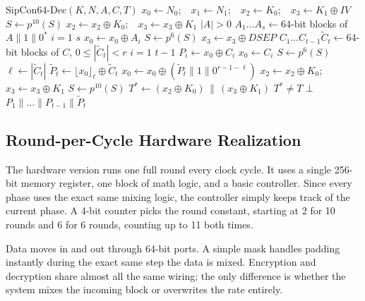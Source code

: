 \begin{algo}{$\mathrm{SipCon64\text{-}Dec}(K, N, A, C, T)$}\label{alg:dec}
\aln $x_0 \leftarrow N_0$;\ \ $x_1 \leftarrow N_1$;\ \ $x_2 \leftarrow K_0$;\ \ $x_3 \leftarrow K_1 \oplus \mathit{IV}$
\aln $S \leftarrow p^{10}(S)$
\aln $x_2 \leftarrow x_2 \oplus K_0$;\ \ $x_3 \leftarrow x_3 \oplus K_1$
\aln {} $|A| > 0$ 
\aln[1] $A_1 \dots A_s \leftarrow 64$-bit blocks of $A\|1\|0^{*}$
\aln[1]  $i = 1$  $s$ 
\aln[2] $x_0 \leftarrow x_0 \oplus A_i$
\aln[2] $S \leftarrow p^{6}(S)$
\aln[1] 
\aln {}
\aln $x_3 \leftarrow x_3 \oplus \mathit{DSEP}$ 
\aln $C_1 \dots C_{t-1}\tilde{C}_t \leftarrow 64$-bit blocks of $C$, $0 \le |\tilde{C}_t| < r$
\aln {} $i = 1$  $t-1$ 
\aln[1] $P_i \leftarrow x_0 \oplus C_i$
\aln[1] $x_0 \leftarrow C_i$ 
\aln[1] $S \leftarrow p^{6}(S)$
\aln {}
\aln $\ell \leftarrow |\tilde{C}_t|$
\aln $\tilde{P}_t \leftarrow \lfloor x_0 \rfloor_{\ell} \oplus \tilde{C}_t$
\aln $x_0 \leftarrow x_0 \oplus (\tilde{P}_t\|1\|0^{r-1-\ell})$ 
\aln $x_2 \leftarrow x_2 \oplus K_0$;\ \ $x_3 \leftarrow x_3 \oplus K_1$
\aln $S \leftarrow p^{10}(S)$
\aln $T^{*} \leftarrow (x_2 \oplus K_0) \,\|\, (x_3 \oplus K_1)$
\aln {} $T^{*} \ne T$  $\bot$ 
\aunn[1]  $P_1\|\dots\|P_{t-1}\|\tilde{P}_t$
\end{algo}

\subsection{Round-per-Cycle Hardware Realization}

The hardware version runs one full round every clock cycle. It uses a single 256-bit memory register, one block of math logic, and a basic controller. Since every phase uses the exact same mixing logic, the controller simply keeps track of the current phase. A 4-bit counter picks the round constant, starting at 2 for 10 rounds and 6 for 6 rounds, counting up to 11 both times.

Data moves in and out through 64-bit ports. A simple mask handles padding instantly during the exact same step the data is mixed. Encryption and decryption share almost all the same wiring; the only difference is whether the system mixes the incoming block or overwrites the rate entirely.

